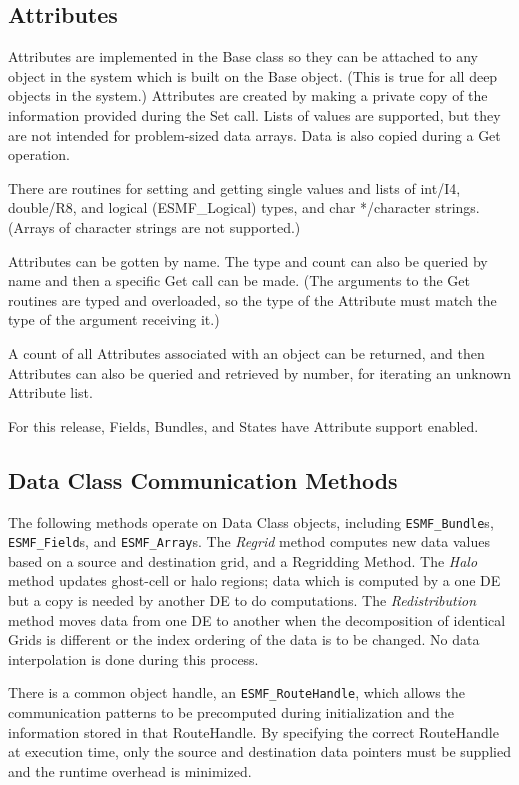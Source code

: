 \subsection{Attributes}

Attributes are implemented in the Base class so they can be attached to
any object in the system which is built on the Base object.  (This is true
for all deep objects in the system.)  Attributes are created by making a
private copy of the information provided during the Set call.  Lists of
values are supported, but they are not intended for problem-sized
data arrays.   Data is also copied during a Get operation.

There are routines for setting and getting single values and lists of
int/I4, double/R8, and logical (ESMF\_Logical) types, and char */character
strings.  (Arrays of character strings are not supported.)

Attributes can be gotten by name.  The type and count can also be queried
by name and then a specific Get call can be made.  (The arguments to the
Get routines are typed and overloaded, so the type of the Attribute must
match the type of the argument receiving it.)

A count of all Attributes associated with an object can be returned, and
then Attributes can also be queried and retrieved by number, for iterating
an unknown Attribute list.

For this release, Fields, Bundles, and States have Attribute support enabled.




\subsection{Data Class Communication Methods}

The following methods operate on Data Class objects, including
{\tt ESMF\_Bundle}s, {\tt ESMF\_Field}s, and {\tt ESMF\_Array}s.
The {\it Regrid} method computes new data values based on a source
and destination grid, and a Regridding Method.  The {\it Halo} 
method updates ghost-cell or halo regions; data which is computed
by a one DE but a copy is needed by another DE to do computations.
The {\it Redistribution} method moves data from one DE to another
when the decomposition of identical Grids is different or the
index ordering of the data is to be changed.  No data
interpolation is done during this process.

There is a common object handle, an {\tt ESMF\_RouteHandle}, which
allows the communication patterns to be precomputed during initialization
and the information stored in that RouteHandle.
By specifying the correct RouteHandle at execution time, only
the source and destination data pointers must be supplied and the
runtime overhead is minimized.

